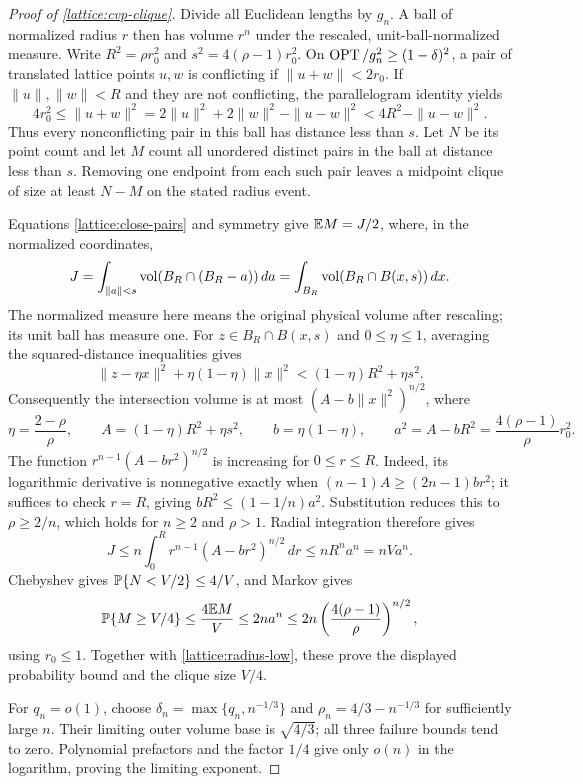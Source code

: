 \begin{proof}[Proof of \cref{lattice:cvp-clique}]
Divide all Euclidean lengths by $g_n$. A ball of normalized radius $r$
then has volume $r^n$ under the rescaled, unit-ball-normalized measure.
Write $R^2=\rho r_0^2$ and $s^2=4(\rho-1)r_0^2$. On
$\operatorname{OPT}/g_n^2\ge(1-\delta)^2$, a pair of translated lattice points $u,w$
is conflicting if $\|u+w\|<2r_0$. If $\|u\|,\|w\|<R$ and they are
not conflicting, the parallelogram identity yields
\begin{equation*}
 4r_0^2\le\|u+w\|^2
 =2\|u\|^2+2\|w\|^2-\|u-w\|^2
 <4R^2-\|u-w\|^2.
\end{equation*}
Thus every nonconflicting pair in this ball has distance less than $s$.
Let $N$ be its point count and let $M$ count all unordered distinct pairs
in the ball at distance less than $s$. Removing one endpoint from each
such pair leaves a midpoint clique of size at least $N-M$ on the stated
radius event.

Equations \eqref{lattice:close-pairs} and symmetry give
$\mathbb{E} M=J/2$, where, in the normalized coordinates,
\begin{equation*}
 J=\int_{\|a\|<s}\operatorname{vol}(B_R\cap(B_R-a))\,da
   =\int_{B_R}\operatorname{vol}(B_R\cap B(x,s))\,dx.
\end{equation*}
The normalized measure here means the original physical volume after
rescaling; its unit ball has measure one. For $z\in B_R\cap B(x,s)$ and
$0\le\eta\le1$, averaging the squared-distance inequalities gives
\begin{equation*}
 \|z-\eta x\|^2+\eta(1-\eta)\|x\|^2
 <(1-\eta)R^2+\eta s^2.
\end{equation*}
Consequently the intersection volume is at most
$(A-b\|x\|^2)^{n/2}$, where
\begin{equation*}
 \eta=\frac{2-\rho}{\rho},\qquad
 A=(1-\eta)R^2+\eta s^2,\qquad b=\eta(1-\eta),
 \qquad a^2=A-bR^2=\frac{4(\rho-1)}\rho r_0^2.
\end{equation*}
The function $r^{n-1}(A-br^2)^{n/2}$ is increasing for $0\le r\le R$.
Indeed, its logarithmic derivative is nonnegative exactly when
$(n-1)A\ge(2n-1)br^2$; it suffices to check $r=R$, giving
$bR^2\le(1-1/n)a^2$. Substitution reduces this to $\rho\ge2/n$,
which holds for $n\ge2$ and $\rho>1$. Radial integration therefore gives
\begin{equation*}
 J\le n\int_0^R r^{n-1}(A-br^2)^{n/2}\,dr
 \le nR^n a^n=nVa^n.
\end{equation*}
Chebyshev gives $\mathbb{P}\{N<V/2\}\le4/V$, and Markov gives
\begin{equation*}
 \mathbb{P}\{M\ge V/4\}\le\frac{4\mathbb{E} M}{V}
 \le2na^n
 \le2n\left(\frac{4(\rho-1)}\rho\right)^{n/2},
\end{equation*}
using $r_0\le1$. Together with \eqref{lattice:radius-low}, these prove the
displayed probability bound and the clique size $V/4$.

For $q_n=o(1)$, choose
$\delta_n=\max\{q_n,n^{-1/3}\}$ and
$\rho_n=4/3-n^{-1/3}$ for sufficiently large $n$. Their limiting outer
volume base is $\sqrt{4/3}$; all three failure bounds tend to zero.
Polynomial prefactors and the factor $1/4$ give only $o(n)$ in the
logarithm, proving the limiting exponent.
\end{proof}

